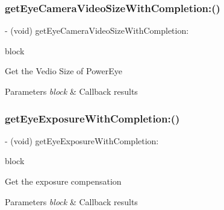 \subsubsection{\texorpdfstring{get\+Eye\+Camera\+Video\+Size\+With\+Completion\+:()}{getEyeCameraVideoSizeWithCompletion:()}}
{\footnotesize\ttfamily -\/ (void) get\+Eye\+Camera\+Video\+Size\+With\+Completion\+: \begin{DoxyParamCaption}\item[{(void($^\wedge$)(P\+V\+Camera\+Video\+Size video\+Size, N\+S\+Error $\ast$\hyperlink{group___p_v_s_d_k___c_o_r_e___a_p_i___m_o_u_n_t_c_o_n_t_r_o_l_ga5a1de33b230662127568783314b4a54d}{\+\_\+\+Nullable} error))}]{block }\end{DoxyParamCaption}}

Get the Vedio Size of Power\+Eye


\begin{DoxyParams}{Parameters}
{\em block} & Callback results \\
\hline
\end{DoxyParams}
\mbox{\label{interface_p_v_camera_adf3aa9a65b5f86442e1319b8e57384ca}} 
\subsubsection{\texorpdfstring{get\+Eye\+Exposure\+With\+Completion\+:()}{getEyeExposureWithCompletion:()}}
{\footnotesize\ttfamily -\/ (void) get\+Eye\+Exposure\+With\+Completion\+: \begin{DoxyParamCaption}\item[{(void($^\wedge$)(N\+S\+Integer exposure, N\+S\+Error $\ast$\hyperlink{group___p_v_s_d_k___c_o_r_e___a_p_i___m_o_u_n_t_c_o_n_t_r_o_l_ga5a1de33b230662127568783314b4a54d}{\+\_\+\+Nullable} error))}]{block }\end{DoxyParamCaption}}

Get the exposure compensation


\begin{DoxyParams}{Parameters}
{\em block} & Callback results \\
\hline
\end{DoxyParams}
\mbox{\label{interface_p_v_camera_a6e8b62164f4f0f27cedc6515143bb0e8}} 
